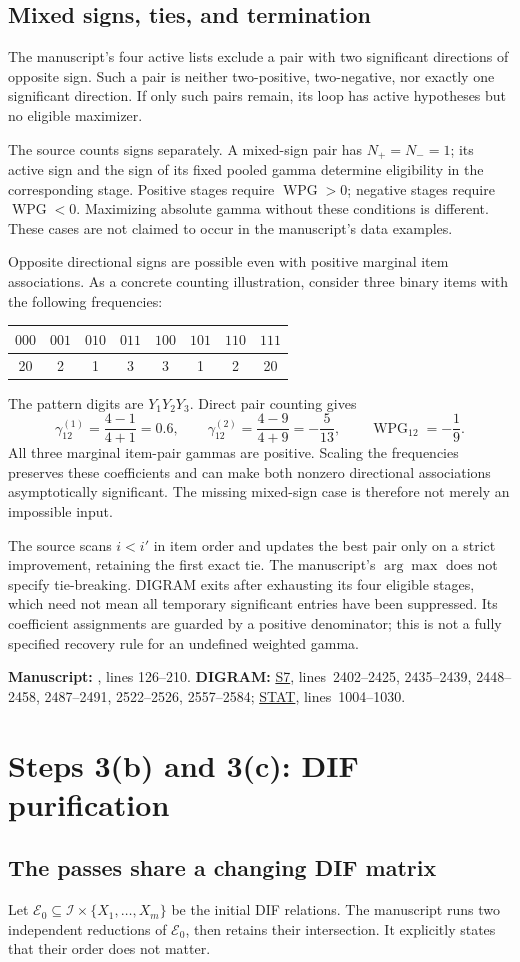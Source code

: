 \documentclass[11pt,a4paper]{article}
\newcommand{\WPG}{\operatorname{WPG}}
\newcommand{\Iset}{\mathcal{I}}
\newcommand{\src}[2]{\hyperlink{source-#1}{\textsf{#1}}, lines~#2}
\newcommand{\trace}[2]{%
  \par\smallskip
  {\footnotesize\color{tracegray}\textbf{Manuscript:} #1.\quad
  \textbf{DIGRAM:} #2.\par}\medskip}
\newcommand{\finding}[1]{\Needspace{5\baselineskip}\subsection{#1}}
\begin{document}
\finding{Mixed signs, ties, and termination}
The manuscript's four active lists exclude a pair with two significant
directions of opposite sign. Such a pair is neither two-positive,
two-negative, nor exactly one significant direction. If only such pairs
remain, its loop has active hypotheses but no eligible maximizer.

The source counts signs separately. A mixed-sign pair has \(N_+=N_-=1\);
its active sign and the sign of its fixed pooled gamma determine eligibility
in the corresponding stage. Positive stages require \(\WPG>0\); negative
stages require \(\WPG<0\). Maximizing absolute gamma without these conditions
is different. These cases are not claimed to occur in the manuscript's
data examples.

Opposite directional signs are possible even with positive marginal
item associations. As a concrete counting illustration, consider three
binary items with the following frequencies:
\begin{center}
\begin{tabular}{@{}cccccccc@{}}
\toprule
\(000\)&\(001\)&\(010\)&\(011\)&\(100\)&\(101\)&\(110\)&\(111\)\\
\midrule
20&2&1&3&3&1&2&20\\
\bottomrule
\end{tabular}
\end{center}
The pattern digits are \(Y_1Y_2Y_3\). Direct pair counting gives
\[
 \gamma_{12}^{(1)}=\frac{4-1}{4+1}=0.6,\qquad
 \gamma_{12}^{(2)}=\frac{4-9}{4+9}=-\frac5{13},\qquad
 \WPG_{12}=-\frac19.
\]
All three marginal item-pair gammas are positive.
Scaling the frequencies preserves these coefficients and can make both
nonzero directional associations asymptotically significant.
The missing mixed-sign case is therefore not merely an impossible input.

The source scans \(i<i'\) in item order and updates the best pair only on a
strict improvement, retaining the first exact tie. The manuscript's
\(\arg\max\) does not specify tie-breaking.
DIGRAM exits after exhausting its four eligible stages, which need not mean
all temporary significant entries have been suppressed.
Its coefficient assignments are guarded by a positive denominator; this is
not a fully specified recovery rule for an undefined weighted gamma.
\trace{, lines 126--210}
{\src{S7}{2402--2425, 2435--2439, 2448--2458, 2487--2491,
 2522--2526, 2557--2584}; \src{STAT}{1004--1030}}

\section{Steps 3(b) and 3(c): DIF purification}
\label{sec:dif}
\finding{The passes share a changing DIF matrix}
Let \(\mathcal E_0\subseteq\Iset\times\{X_1,\ldots,X_m\}\) be the initial
DIF relations. The manuscript runs two independent reductions of
\(\mathcal E_0\), then retains their intersection. It explicitly states
that their order does not matter.
\end{document}

